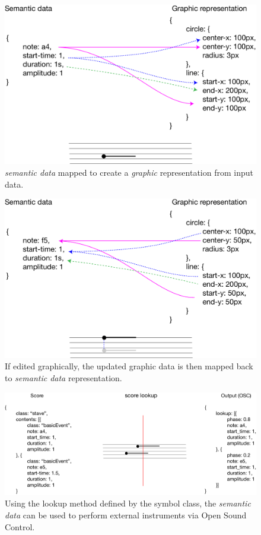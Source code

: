 \documentclass{article}
\begin{document}
\begin{figure}[ht!]
\centering
\includegraphics[width=0.9\columnwidth]{data-to-graphic.pdf}
\caption{\textit{semantic data} mapped to create a \textit{graphic} representation from input data.
\label{fig:data-to-graphic}}
\end{figure}

\begin{figure}[ht!]
\centering
\includegraphics[width=0.9\columnwidth]{graphic-to-data.pdf}
\caption{If edited graphically, the updated graphic data is then mapped back to \textit{semantic data} representation. 
\label{fig:graphic-to-data}}
\end{figure}

\begin{figure}[ht!]
\centering
\includegraphics[width=1\columnwidth]{score-lookup.pdf}
\caption{Using the lookup method defined by the symbol class, the \textit{semantic data} can be used to perform external instruments via Open Sound Control. 
\label{fig:score-lookup}}
\end{figure}
\end{document}
